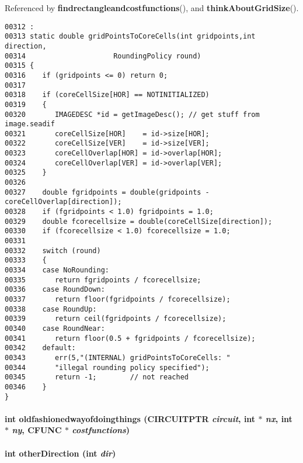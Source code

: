 Referenced by {\bf findrectangleandcostfunctions}(), and {\bf think\-About\-Grid\-Size}().\small\begin{verbatim}00312 :
00313 static double gridPointsToCoreCells(int gridpoints,int direction,
00314                     RoundingPolicy round)
00315 {
00316    if (gridpoints <= 0) return 0;
00317 
00318    if (coreCellSize[HOR] == NOTINITIALIZED)
00319    {
00320       IMAGEDESC *id = getImageDesc(); // get stuff from image.seadif
00321       coreCellSize[HOR]    = id->size[HOR];
00322       coreCellSize[VER]    = id->size[VER];
00323       coreCellOverlap[HOR] = id->overlap[HOR];
00324       coreCellOverlap[VER] = id->overlap[VER];
00325    }
00326 
00327    double fgridpoints = double(gridpoints - coreCellOverlap[direction]);
00328    if (fgridpoints < 1.0) fgridpoints = 1.0;
00329    double fcorecellsize = double(coreCellSize[direction]);
00330    if (fcorecellsize < 1.0) fcorecellsize = 1.0;
00331 
00332    switch (round)
00333    {
00334    case NoRounding:
00335       return fgridpoints / fcorecellsize;
00336    case RoundDown:
00337       return floor(fgridpoints / fcorecellsize);
00338    case RoundUp:
00339       return ceil(fgridpoints / fcorecellsize);
00340    case RoundNear:
00341       return floor(0.5 + fgridpoints / fcorecellsize);
00342    default:
00343       err(5,"(INTERNAL) gridPointsToCoreCells: "
00344       "illegal rounding policy specified");
00345       return -1;        // not reached
00346    }
}
\end{verbatim}\normalsize 
\label{findrect.C_a16}
\paragraph{\setlength{\rightskip}{0pt plus 5cm}int oldfashionedwayofdoingthings (CIRCUITPTR {\em circuit}, int $\ast$ {\em nx}, int $\ast$ {\em ny}, {\bf CFUNC} $\ast$ {\em costfunctions})\hspace{0.3cm}{\tt  [static]}}\hfill

\label{findrect.C_a18}
\paragraph{\setlength{\rightskip}{0pt plus 5cm}int other\-Direction (int {\em dir})\hspace{0.3cm}{\tt  [static]}}\hfill



